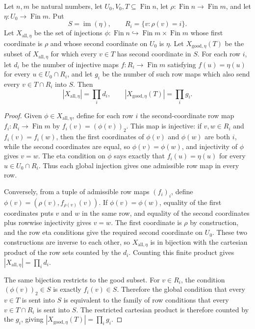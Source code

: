 \begin{helper}
Let \(n,m\) be natural numbers, let \(U_0,V_0,T\subseteq \operatorname{Fin} n\),
let \(\rho:\operatorname{Fin}n\to\operatorname{Fin}m\), and let
\(\eta:U_0\to\operatorname{Fin}m\).  Put
\[
S=\operatorname{im}(\eta),\qquad R_i=\{v:\rho(v)=i\}.
\]
Let \(X_{\mathrm{all},\eta}\) be the set of injections
\(\phi:\operatorname{Fin}n\hookrightarrow\operatorname{Fin}m\times
\operatorname{Fin}m\) whose first coordinate is \(\rho\) and whose second
coordinate on \(U_0\) is \(\eta\).  Let \(X_{\mathrm{good},\eta}(T)\) be
the subset of \(X_{\mathrm{all},\eta}\) for which every \(v\in T\) has
second coordinate in \(S\).  For each row \(i\), let \(d_i\) be the number
of injective maps \(f:R_i\to\operatorname{Fin}m\) satisfying
\(f(u)=\eta(u)\) for every \(u\in U_0\cap R_i\), and let \(g_i\) be the
number of such row maps which also send every \(v\in T\cap R_i\) into
\(S\).  Then
\[
|X_{\mathrm{all},\eta}|=\prod_i d_i,\qquad
|X_{\mathrm{good},\eta}(T)|=\prod_i g_i.
\]
\end{helper}
\begin{proof}
Given \(\phi\in X_{\mathrm{all},\eta}\), define for each row \(i\) the
second-coordinate row map \(f_i:R_i\to\operatorname{Fin}m\) by
\(f_i(v)=(\phi(v))_2\).  This map is injective: if \(v,w\in R_i\) and
\(f_i(v)=f_i(w)\), then the first coordinates of \(\phi(v)\) and
\(\phi(w)\) are both \(i\), while the second coordinates are equal, so
\(\phi(v)=\phi(w)\), and injectivity of \(\phi\) gives \(v=w\).  The eta
condition on \(\phi\) says exactly that \(f_i(u)=\eta(u)\) for every
\(u\in U_0\cap R_i\).  Thus each global injection gives one admissible row
map in every row.

Conversely, from a tuple of admissible row maps \((f_i)_i\), define
\(\phi(v)=(\rho(v),f_{\rho(v)}(v))\).  If \(\phi(v)=\phi(w)\), equality of
the first coordinates puts \(v\) and \(w\) in the same row, and equality of
the second coordinates plus rowwise injectivity gives \(v=w\).  The first
coordinate is \(\rho\) by construction, and the row eta conditions give the
required second coordinate on \(U_0\).  These two constructions are inverse
to each other, so \(X_{\mathrm{all},\eta}\) is in bijection with the
cartesian product of the row sets counted by the \(d_i\).  Counting this
finite product gives \(|X_{\mathrm{all},\eta}|=\prod_i d_i\).

The same bijection restricts to the good subset.  For \(v\in R_i\), the
condition \((\phi(v))_2\in S\) is exactly \(f_i(v)\in S\).  Therefore the
global condition that every \(v\in T\) is sent into \(S\) is equivalent to
the family of row conditions that every \(v\in T\cap R_i\) is sent into
\(S\).  The restricted cartesian product is therefore counted by the
\(g_i\), giving
\(|X_{\mathrm{good},\eta}(T)|=\prod_i g_i\).
\end{proof}
